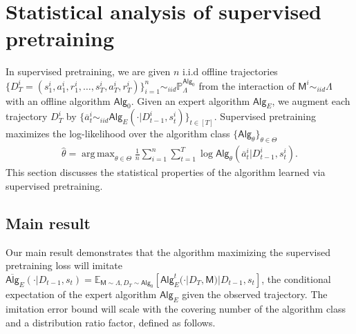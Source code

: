 \documentclass[10pt]{article}
\DeclareMathOperator*{\argmax}{arg\,max}
\newcommand{\<}{\left\langle}
\renewcommand{\>}{\right\rangle}
\newcommand{\E}{\mathbb{E}}
\renewcommand{\P}{\mathbb{P}}
\newcommand{\inst}{{\mathsf{M}}}
\newcommand{\widebar}[1]{\overline{#1}}
\newcommand{\state}{{s}}
\newcommand{\action}{{a}}
\newcommand{\eaction}{{\widebar{a}}}
\newcommand{\reward}{{r}}
\newcommand{\totlen}{{T}}
\newcommand{\ith}{{i}}
\newcommand{\sAlg}{{\mathsf{Alg}}}
\newcommand{\osAlg}{\overline{\mathsf{Alg}}}
\newcommand{\dset}{{D}}
\newcommand{\Numobs}{{n}}
\newcommand{\Par}{{\theta}}
\newcommand{\Parspace}{{\Theta}}
\newcommand{\EstPar}{{\widehat{\theta}}}
\newcommand{\prior}{{\Lambda}}
\newcommand{\shortexp}{{E}}
\begin{document}
\section{Statistical analysis of supervised pretraining}\label{sec:supervised-pretraining}


In supervised pretraining, we are given $\Numobs$ i.i.d offline trajectories $\{\dset^\ith_\totlen =  (\state^\ith_1,\action^\ith_1, \reward^\ith_1, \ldots, \state^\ith_\totlen, \allowbreak \action^\ith_\totlen, \allowbreak\reward^\ith_\totlen) \}_{i=1}^\Numobs \sim_{iid} \P_\prior^{\sAlg_0}$ from the interaction of $\inst^\ith \sim_{iid} \prior$ with an offline algorithm $\sAlg_0$. Given an expert algorithm $\sAlg_{\shortexp}$, we augment each trajectory $\dset_{\totlen}^i$ by $\{ \eaction_t^i \sim_{iid} \sAlg_{\shortexp}( \cdot |\dset_{t-1}^i, \state_t^i)\}_{t \in [\totlen]}$. Supervised pretraining maximizes the log-likelihood over the algorithm class $\{ \sAlg_\Par\}_{\Par\in\Parspace}$
\begin{align}
\EstPar=\argmax_{\Par\in\Parspace}  \frac{1}{\Numobs}\sum_{i=1}^\Numobs\sum_{t=1}^\totlen\log \sAlg_\Par(\eaction^\ith_{t}|\dset_{t-1}^\ith,\state^\ith_t). \label{eq:general_mle}
\end{align}
This section discusses the statistical properties of the algorithm learned via supervised pretraining.






\subsection{Main result}











Our main result demonstrates that the algorithm maximizing the supervised pretraining loss will imitate $\osAlg_{\shortexp}(\cdot|\dset_{t-1},\state_t) = \E_{\inst\sim \prior,  \dset_{\totlen} \sim \sAlg_0}[\sAlg_{\shortexp}^t(\cdot|\dset_\totlen,\inst)|\dset_{t-1},\state_t]$, the conditional expectation of the expert algorithm $\sAlg_{\shortexp}$ given the observed trajectory. The imitation error bound will scale with the covering number of the algorithm class and a  distribution ratio factor, defined as follows.
\end{document}
